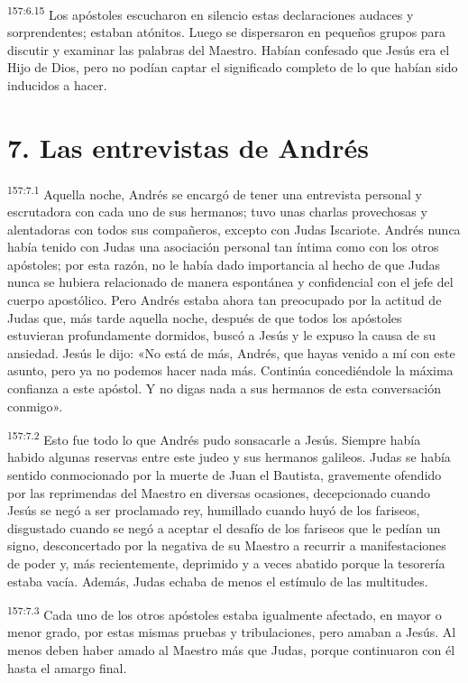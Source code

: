 \par 
\textsuperscript{157:6.15} Los apóstoles escucharon en silencio estas declaraciones audaces y sorprendentes; estaban atónitos. Luego se dispersaron en pequeños grupos para discutir y examinar las palabras del Maestro. Habían confesado que Jesús era el Hijo de Dios, pero no podían captar el significado completo de lo que habían sido inducidos a hacer.

\section*{7. Las entrevistas de Andrés}
\par 
\textsuperscript{157:7.1} Aquella noche, Andrés se encargó de tener una entrevista personal y escrutadora con cada uno de sus hermanos; tuvo unas charlas provechosas y alentadoras con todos sus compañeros, excepto con Judas Iscariote. Andrés nunca había tenido con Judas una asociación personal tan íntima como con los otros apóstoles; por esta razón, no le había dado importancia al hecho de que Judas nunca se hubiera relacionado de manera espontánea y confidencial con el jefe del cuerpo apostólico. Pero Andrés estaba ahora tan preocupado por la actitud de Judas que, más tarde aquella noche, después de que todos los apóstoles estuvieran profundamente dormidos, buscó a Jesús y le expuso la causa de su ansiedad. Jesús le dijo: «No está de más, Andrés, que hayas venido a mí con este asunto, pero ya no podemos hacer nada más. Continúa concediéndole la máxima confianza a este apóstol. Y no digas nada a sus hermanos de esta conversación conmigo».

\par 
\textsuperscript{157:7.2} Esto fue todo lo que Andrés pudo sonsacarle a Jesús. Siempre había habido algunas reservas entre este judeo y sus hermanos galileos. Judas se había sentido conmocionado por la muerte de Juan el Bautista, gravemente ofendido por las reprimendas del Maestro en diversas ocasiones, decepcionado cuando Jesús se negó a ser proclamado rey, humillado cuando huyó de los fariseos, disgustado cuando se negó a aceptar el desafío de los fariseos que le pedían un signo, desconcertado por la negativa de su Maestro a recurrir a manifestaciones de poder y, más recientemente, deprimido y a veces abatido porque la tesorería estaba vacía. Además, Judas echaba de menos el estímulo de las multitudes.

\par 
\textsuperscript{157:7.3} Cada uno de los otros apóstoles estaba igualmente afectado, en mayor o menor grado, por estas mismas pruebas y tribulaciones, pero amaban a Jesús. Al menos deben haber amado al Maestro más que Judas, porque continuaron con él hasta el amargo final.

